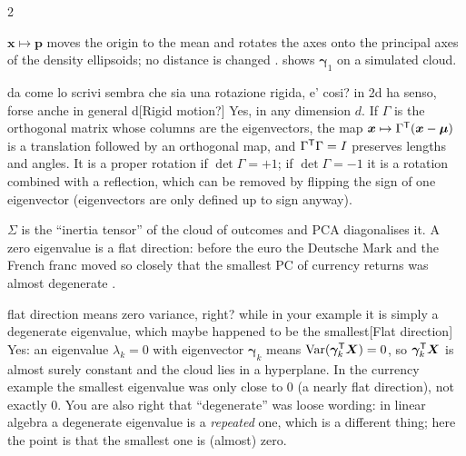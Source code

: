 \begin{paracol}{2}
\begin{intuition}
$\bm x\mapsto\bm p$ moves the origin to the mean and rotates the axes onto the principal axes of the
density ellipsoids; no distance is changed .  shows $\bm\gamma_1$ on a simulated cloud.\begin{answer}{da come lo scrivi sembra che sia una rotazione rigida, e' cosi? in 2d ha senso, forse anche in general d}[Rigid motion?]
Yes, in any dimension $d$. If $\Gamma$ is the orthogonal matrix whose columns are the eigenvectors, the map $\bm x\mapsto\Gamma^{\mathsf T}(\bm x-\bm\mu)$ is a
translation followed by an orthogonal map, and $\Gamma^{\mathsf T}\Gamma=I$ preserves lengths and angles. It is a proper rotation if
$\det\Gamma=+1$; if $\det\Gamma=-1$ it is a rotation combined with a reflection, which can be removed by flipping the sign of one
eigenvector (eigenvectors are only defined up to sign anyway).
\end{answer} $\Sigma$ is the ``inertia tensor'' of the cloud of
outcomes and PCA diagonalises it. A zero eigenvalue is a flat direction: before the euro the Deutsche Mark and
the French franc moved so closely that the smallest PC of currency returns was almost degenerate
. \begin{answer}{flat direction means zero variance, right? while in your example it is simply a degenerate eigenvalue, which maybe happened to be the smallest}[Flat direction]
Yes: an eigenvalue $\lambda_k=0$ with eigenvector $\bm\gamma_k$ means $\operatorname{Var}(\bm\gamma_k^{\mathsf T}\bm X)=0$, so $\bm\gamma_k^{\mathsf T}\bm X$ is almost surely constant and the cloud lies in
a hyperplane. In the currency example the smallest eigenvalue was only close to $0$ (a nearly flat direction), not exactly $0$. You are
also right that ``degenerate'' was loose wording: in linear algebra a degenerate eigenvalue is a \emph{repeated} one, which is a
different thing; here the point is that the smallest one is (almost) zero.
\end{answer}
\end{intuition}


\end{paracol}
